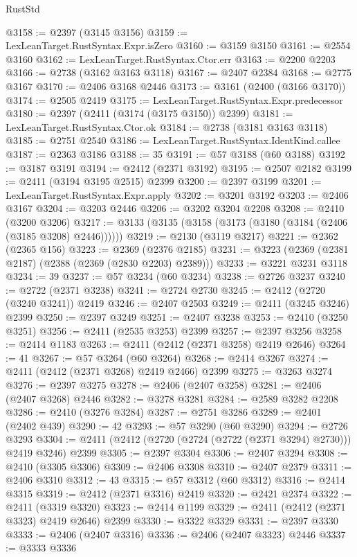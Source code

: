 \begin{lexlean}{RustStd}
\begin{coremodule}
@3158 := @2397 (@3145 @3156)
@3159 := LexLeanTarget.RustSyntax.Expr.isZero
@3160 := @3159 @3150
@3161 := @2554 @3160
@3162 := LexLeanTarget.RustSyntax.Ctor.err
@3163 := @2200 @2203
@3166 := @2738 (@3162 @3163 @3118)
@3167 := @2407 @2384
@3168 := @2775 @3167
@3170 := @2406 @3168 @2446
@3173 := @3161 (@2400 (@3166 @3170))
@3174 := @2505 @2419
@3175 := LexLeanTarget.RustSyntax.Expr.predecessor
@3180 := @2397 (@2411 (@3174 (@3175 @3150)) @2399)
@3181 := LexLeanTarget.RustSyntax.Ctor.ok
@3184 := @2738 (@3181 @3163 @3118)
@3185 := @2751 @2540
@3186 := LexLeanTarget.RustSyntax.IdentKind.callee
@3187 := @2363 @3186
@3188 := 35
@3191 := @57 @3188 (@60 @3188)
@3192 := @3187 @3191
@3194 := @2412 (@2371 @3192)
@3195 := @2507 @2182
@3199 := @2411 (@3194 @3195 @2515) @2399
@3200 := @2397 @3199
@3201 := LexLeanTarget.RustSyntax.Expr.apply
@3202 := @3201 @3192
@3203 := @2406 @3167
@3204 := @3203 @2446
@3206 := @3202 @3204 @2208
@3208 := @2410 (@3200 @3206)
@3217 := @3133 (@3135 (@3158 (@3173 (@3180 (@3184 (@2406 (@3185 @3208) @2446))))))
@3219 := @2130 (@3119 @3217)
@3221 := @2362 (@2365 @156)
@3223 := @2369 (@2376 @2185)
@3231 := @3223 (@2369 (@2381 @2187) (@2388 (@2369 (@2830 @2203) @2389)))
@3233 := @3221 @3231 @3118
@3234 := 39
@3237 := @57 @3234 (@60 @3234)
@3238 := @2726 @3237
@3240 := @2722 (@2371 @3238)
@3241 := @2724 @2730
@3245 := @2412 (@2720 (@3240 @3241)) @2419
@3246 := @2407 @2503
@3249 := @2411 (@3245 @3246) @2399
@3250 := @2397 @3249
@3251 := @2407 @3238
@3253 := @2410 (@3250 @3251)
@3256 := @2411 (@2535 @3253) @2399
@3257 := @2397 @3256
@3258 := @2414 @1183
@3263 := @2411 (@2412 (@2371 @3258) @2419 @2646)
@3264 := 41
@3267 := @57 @3264 (@60 @3264)
@3268 := @2414 @3267
@3274 := @2411 (@2412 (@2371 @3268) @2419 @2466) @2399
@3275 := @3263 @3274
@3276 := @2397 @3275
@3278 := @2406 (@2407 @3258)
@3281 := @2406 (@2407 @3268) @2446
@3282 := @3278 @3281
@3284 := @2589 @3282 @2208
@3286 := @2410 (@3276 @3284)
@3287 := @2751 @3286
@3289 := @2401 (@2402 @439)
@3290 := 42
@3293 := @57 @3290 (@60 @3290)
@3294 := @2726 @3293
@3304 := @2411 (@2412 (@2720 (@2724 (@2722 (@2371 @3294) @2730))) @2419 @3246) @2399
@3305 := @2397 @3304
@3306 := @2407 @3294
@3308 := @2410 (@3305 @3306)
@3309 := @2406 @3308
@3310 := @2407 @2379
@3311 := @2406 @3310
@3312 := 43
@3315 := @57 @3312 (@60 @3312)
@3316 := @2414 @3315
@3319 := @2412 (@2371 @3316) @2419
@3320 := @2421 @2374
@3322 := @2411 (@3319 @3320)
@3323 := @2414 @1199
@3329 := @2411 (@2412 (@2371 @3323) @2419 @2646) @2399
@3330 := @3322 @3329
@3331 := @2397 @3330
@3333 := @2406 (@2407 @3316)
@3336 := @2406 (@2407 @3323) @2446
@3337 := @3333 @3336

\end{coremodule}
\end{lexlean}
